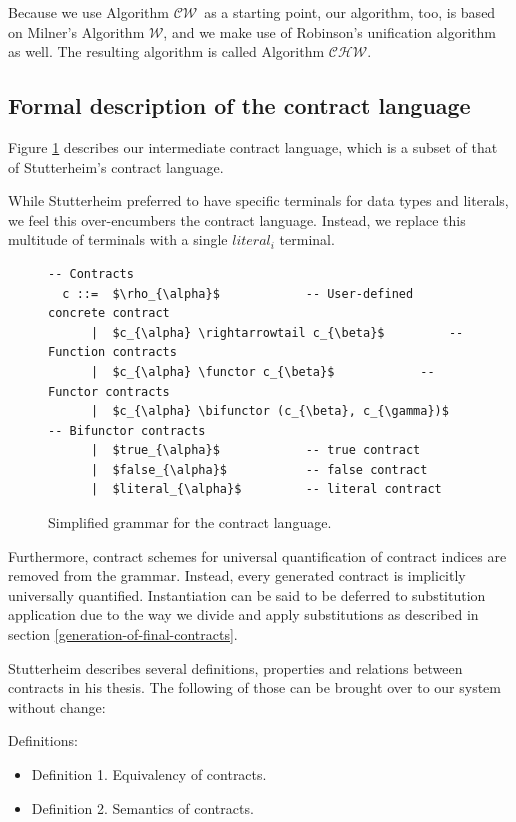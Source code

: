 \documentclass[10pt]{report}
\makeatletter
\newcommand{\functor}{<\!\!\!@\!\!\!>}
\newcommand{\bifunctor}{<\!\!\!@\!\!@\!\!\!>}
\newcommand{\W}{$\mathcal{W}$}
\newcommand{\CW}{$\mathcal{CW}$}
\newcommand{\CHW}{$\mathcal{CHW}$}
\makeatother
\begin{document}
Because we use Algorithm \CW ~as a starting point, our algorithm, too, is based on Milner's Algorithm \W, and we make use of Robinson's unification algorithm as well.
The resulting algorithm is called Algorithm \CHW.

\subsection{Formal description of the contract language}
Figure \ref{fig:contract-grammar} describes our intermediate contract language, which is a subset of that of Stutterheim's contract language.

While Stutterheim preferred to have specific terminals for data types and literals, we feel this over-encumbers the contract language.
Instead, we replace this multitude of terminals with a single $literal_i$ terminal.

\begin{figure}[htbp]
\begin{center}
\begin{lstlisting}[mathescape]
  -- Contracts
  c ::=  $\rho_{\alpha}$			-- User-defined concrete contract
      |  $c_{\alpha} \rightarrowtail c_{\beta}$			-- Function contracts
      |  $c_{\alpha} \functor c_{\beta}$			-- Functor contracts
      |  $c_{\alpha} \bifunctor (c_{\beta}, c_{\gamma})$			-- Bifunctor contracts
      |  $true_{\alpha}$			-- true contract
      |  $false_{\alpha}$			-- false contract
      |  $literal_{\alpha}$			-- literal contract
\end{lstlisting}
\end{center}
\caption{\label{fig:contract-grammar}Simplified grammar for the contract language.}
\end{figure}

Furthermore, contract schemes for universal quantification of contract indices are removed from the grammar.
Instead, every generated contract is implicitly universally quantified.
Instantiation can be said to be deferred to substitution application due to the way we divide and apply substitutions as described in section \ref{generation-of-final-contracts}.

Stutterheim describes several definitions, properties and relations between contracts in his thesis. 
The following of those can be brought over to our system without change:

Definitions:
\begin{itemize}
	\item Definition 1. Equivalency of contracts.
	\item Definition 2. Semantics of contracts.
\end{itemize}
\end{document}
